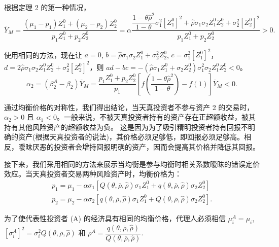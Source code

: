 \documentclass[10.0pt]{article}
\begin{document}
根据定理 2 的第一种情况，
\begin{equation*}
\overline{Y}_M = \dfrac{(\mu_1 - p_1) Z_1^0 + (\mu_2 - p_2) Z_2^0}{p_1 Z_1^0 + p_2 Z_2^0} = \alpha\dfrac{\dfrac{1 - \theta\hat{\rho}^2}{1 - \theta} \sigma_1^2 \left[ Z_1^0 \right]^2 + \hat{\rho} \sigma_1 \sigma_2 Z_1^0 Z_2^0 + \sigma_2^2 \left[ Z_2^0 \right]^2}{p_1 Z_1^0 + p_2 Z_2^0} > 0.
\end{equation*}



使用相同的方法，现在让 $ a = 0 $, $ b = \hat{\rho} \sigma_1 \sigma_2 Z_1^0 + \sigma_2^2 Z_2^0 $, $ c = \sigma_1^2 \left[ Z_1 ^0 \right]^2 $，$ d = 2 \hat{\rho} \sigma_1 \sigma_2 Z_1^0 Z_2^0 + \sigma_2^2 \left[ Z_2^0 \right]^2 $，则 $ a d - b c = - (\hat{\rho} \sigma_1 Z_1^0 + \sigma_2 Z_2^0) \sigma_1^2 \sigma_2 Z_1^0 Z_2^0 < 0 $。 
\begin{equation*}
\alpha_2 = (\beta_2^A - \beta_2) \overline{Y}_M = \dfrac{p_1 Z_1^0 + p_2 Z_2^0}{p_1} \left[ f \left( \dfrac{1 - \theta \hat{\rho}^2}{1 - \theta} \right) - f (1) \right] \overline{Y}_M < 0. 
\end{equation*}



通过均衡价格的对称性，我们得出结论，当天真投资者不参与资产 2 的交易时，$\alpha_2 > 0 $ 且 $\alpha_1 < 0 $。一般来说，不被天真投资者持有的资产存在正超额收益，被其持有其他风险资产的超额收益为负。 这是因为为了吸引精明投资者持有回报不明确的资产(根据天真投资者的说法)，其价格必须足够低，即回报必须足够高。相反，暧昧厌恶的投资者会增持回报明确的资产，因而会提高其价格并降低其回报。



接下来，我们采用相同的方法来展示当均衡是参与均衡时相关系数暧昧的错误定价效应。当天真投资者交易两种风险资产时，均衡价格为：
\begin{eqnarray*}
& p_1 = \mu_1 - \alpha \sigma_1 \left[ Q (\theta, \overline{\rho}, {\hat \rho}) \sigma_1 Z_1^0 + q (\theta, \overline{\rho}, {\hat \rho}) \sigma_2 Z_2^0 \right] & \\
& p_2 = \mu_2 - \alpha \sigma_2 \left[ q (\theta, \overline{\rho}, {\hat \rho}) \sigma_1 Z_1^0 + Q (\theta, \overline{\rho}, {\hat \rho}) \sigma_2 Z_2^0 \right]. &
\end{eqnarray*}



为了使代表性投资者 (A) 的经济具有相同的均衡价格，代理人必须相信 $ \mu_i^A = \mu_i $, $ \left[ \sigma_i^A \right]^2 = \sigma_i^ 2 Q (\theta, \overline{\rho}, {\hat \rho}) $ 和 $ \rho^A = \dfrac{q (\theta, \overline{\rho}, {\hat \rho}) }{Q (\theta, \overline{\rho}, {\hat \rho})} $.
\end{document}
